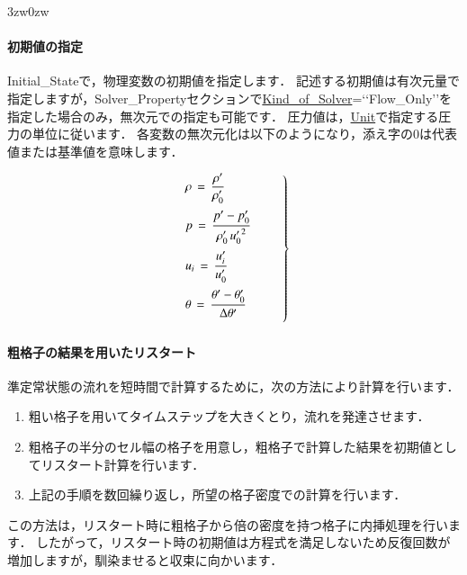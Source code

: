 \begin{indentation}{3zw}{0zw}
\paragraph{初期値の指定}
Initial\_Stateで，\hypertarget{tgt:initial_state}{物理変数}の初期値を指定します．
記述する初期値は有次元量で指定しますが，Solver\_Propertyセクションで\hyperlink{tgt:solver_property}{Kind\_of\_Solver}=\lq\lq Flow\_Only\rq\rq を指定した場合のみ，無次元での指定も可能です．
圧力値は，\hyperlink{tgt:unit}{Unit}で指定する圧力の単位に従います．
各変数の無次元化は以下のようになり，添え字の0は代表値または基準値を意味します．

\begin{equation}
\left.
\begin{array}{l}
\vspace{2mm}
\displaystyle{ \rho \,=\, \frac{\rho^{\prime}}{\rho_{0}^{\prime}} } \\
\vspace{2mm}
\displaystyle{ p \,=\, \frac{p^{\prime}-p_{0}^{\prime}}{\rho_{0}^{\prime}\,{u_{0}^{\prime}}^{2}} } \\
\vspace{2mm}
\displaystyle{ u_{i} \,=\, \frac{u_{i}^{\prime}}{u_0^{\prime}} } \\
\vspace{2mm}
\displaystyle{ \theta \,=\, \frac{\theta^{\prime}-\theta_{0}^{\prime}}{\Delta \theta^{\prime}} } 
\end{array} \qquad \right \}
\end{equation}


\paragraph{粗格子の結果を用いたリスタート}
準定常状態の流れを短時間で計算するために，次の方法により計算を行います．

\begin{enumerate}
\item 粗い格子を用いてタイムステップを大きくとり，流れを発達させます．
\item 粗格子の半分のセル幅の格子を用意し，粗格子で計算した結果を初期値としてリスタート計算を行います．
\item 上記の手順を数回繰り返し，所望の格子密度での計算を行います．
\end{enumerate}

この方法は，リスタート時に粗格子から倍の密度を持つ格子に内挿処理を行います．
したがって，リスタート時の初期値は方程式を満足しないため反復回数が増加しますが，馴染ませると収束に向かいます．


\end{indentation}
